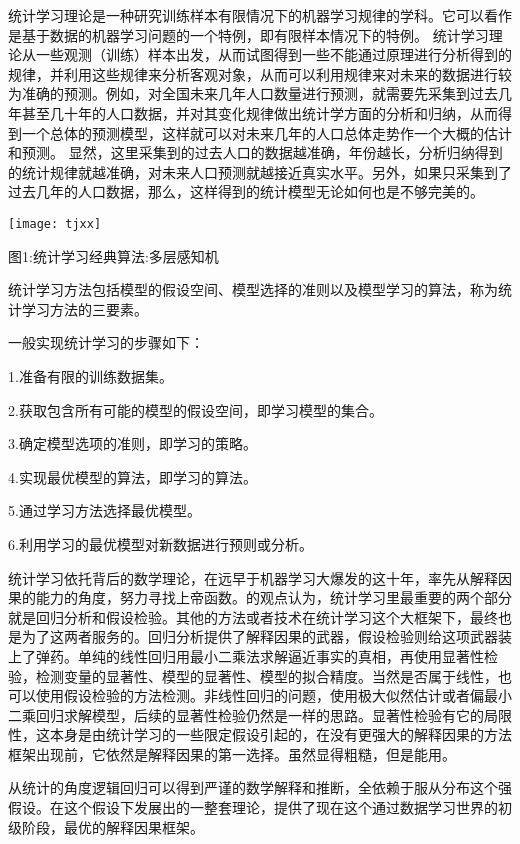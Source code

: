 \documentclass{article}
\begin{document}
统计学习理论是一种研究训练样本有限情况下的机器学习规律的学科。它可以看作是基于数据的机器学习问题的一个特例，即有限样本情况下的特例。
统计学习理论从一些观测（训练）样本出发，从而试图得到一些不能通过原理进行分析得到的规律，并利用这些规律来分析客观对象，从而可以利用规律来对未来的数据进行较为准确的预测。例如，对全国未来几年人口数量进行预测，就需要先采集到过去几年甚至几十年的人口数据，并对其变化规律做出统计学方面的分析和归纳，从而得到一个总体的预测模型，这样就可以对未来几年的人口总体走势作一个大概的估计和预测。
显然，这里采集到的过去人口的数据越准确，年份越长，分析归纳得到的统计规律就越准确，对未来人口预测就越接近真实水平。另外，如果只采集到了过去几年的人口数据，那么，这样得到的统计模型无论如何也是不够完美的。



\begin{center}
\texttt{[image: tjxx]}
\caption{图1:统计学习经典算法:多层感知机}
\end{center}

\par
统计学习方法包括模型的假设空间、模型选择的准则以及模型学习的算法，称为统计学习方法的三要素。

一般实现统计学习的步骤如下：

1.准备有限的训练数据集。

2.获取包含所有可能的模型的假设空间，即学习模型的集合。

3.确定模型选项的准则，即学习的策略。

4.实现最优模型的算法，即学习的算法。

5.通过学习方法选择最优模型。

6.利用学习的最优模型对新数据进行预则或分析。

统计学习依托背后的数学理论，在远早于机器学习大爆发的这十年，率先从解释因果的能力的角度，努力寻找上帝函数。的观点认为，统计学习里最重要的两个部分就是回归分析和假设检验。其他的方法或者技术在统计学习这个大框架下，最终也是为了这两者服务的。回归分析提供了解释因果的武器，假设检验则给这项武器装上了弹药。单纯的线性回归用最小二乘法求解逼近事实的真相，再使用显著性检验，检测变量的显著性、模型的显著性、模型的拟合精度。当然是否属于线性，也可以使用假设检验的方法检测。非线性回归的问题，使用极大似然估计或者偏最小二乘回归求解模型，后续的显著性检验仍然是一样的思路。显著性检验有它的局限性，这本身是由统计学习的一些限定假设引起的，在没有更强大的解释因果的方法框架出现前，它依然是解释因果的第一选择。虽然显得粗糙，但是能用。\par
从统计的角度逻辑回归可以得到严谨的数学解释和推断，全依赖于服从分布这个强假设。在这个假设下发展出的一整套理论，提供了现在这个通过数据学习世界的初级阶段，最优的解释因果框架。
\end{document}
